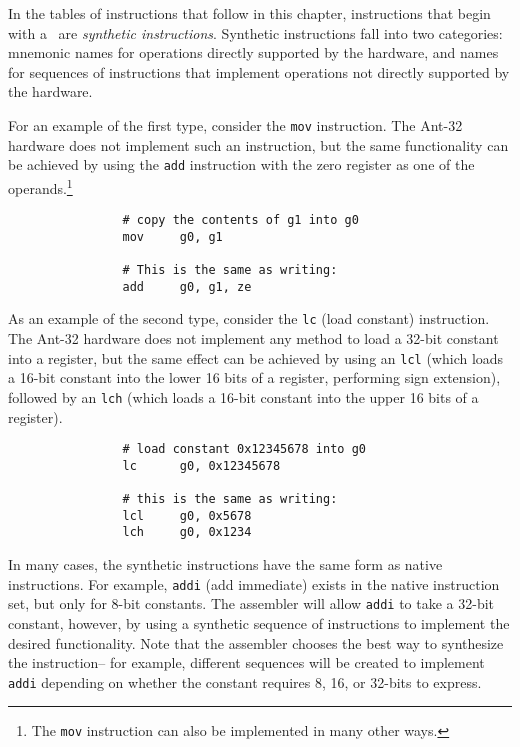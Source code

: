 In the tables of instructions that follow in this chapter,
instructions that begin with a \SYN\ are {\em synthetic instructions}.
Synthetic instructions fall into two categories: mnemonic names for
operations directly supported by the hardware, and names for sequences
of instructions that implement operations not directly supported by
the hardware.

For an example of the first type, consider the {\tt mov} instruction. 
The Ant-32 hardware does not implement such an instruction, but
the same functionality can be achieved by using the {\tt add}
instruction with the zero register as one of the operands.\footnote{The
{\tt mov} instruction can also be implemented in many other ways.}

\begin{verbatim}
                # copy the contents of g1 into g0
                mov     g0, g1

                # This is the same as writing:
                add     g0, g1, ze
\end{verbatim}

As an example of the second type, consider the {\tt lc} (load
constant) instruction.  The Ant-32 hardware does not implement
any method to load a 32-bit constant into a register, but the same
effect can be achieved by using an {\tt lcl} (which loads a 16-bit
constant into the lower 16 bits of a register, performing sign
extension), followed by an {\tt lch} (which loads a 16-bit constant
into the upper 16 bits of a register).

\begin{verbatim}
                # load constant 0x12345678 into g0
                lc      g0, 0x12345678

                # this is the same as writing:
                lcl     g0, 0x5678
                lch     g0, 0x1234
\end{verbatim}

In many cases, the synthetic instructions have the same form as native
instructions.  For example, {\tt addi} (add immediate) exists in the
native instruction set, but only for 8-bit constants.  The assembler
will allow {\tt addi} to take a 32-bit constant, however, by using a
synthetic sequence of instructions to implement the desired
functionality.  Note that the assembler chooses the best way to
synthesize the instruction-- for example, different sequences will be
created to implement {\tt addi} depending on whether the constant
requires 8, 16, or 32-bits to express.

